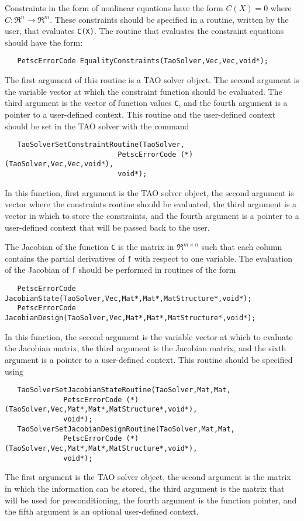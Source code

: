 Constraints in the form of nonlinear equations have the form
$C(X) = 0$ where $C: \Re^n \to \Re^m$.
These constraints should be specified in a 
routine, written by the user, that evaluates {\tt C(X)}.
The routine that evaluates the constraint equations should have the form:
\begin{verbatim}
   PetscErrorCode EqualityConstraints(TaoSolver,Vec,Vec,void*);
\end{verbatim}
\noindent
The first argument of this routine is a TAO solver object.  The second argument
is the variable vector at which the constraint function should be evaluated.  
The third argument is the vector of function values {\tt C}, and the fourth
argument is a pointer to a user-defined context.
This routine  and the user-defined context 
should be set in the TAO solver with the command
\begin{verbatim}
   TaoSolverSetConstraintRoutine(TaoSolver,
                           PetscErrorCode (*)(TaoSolver,Vec,Vec,void*),
                           void*);
\end{verbatim}
\noindent
In this function, first argument is the TAO solver object,
the second argument is vector where the constraints routine should be
evaluated, the third argument is a vector in which to store the constraints,
and the fourth argument is a pointer to a user-defined context that will
be passed back to the user.

The Jacobian of the function {\tt C} is the matrix in $\Re^{m \times n}$
such that each column contains the partial derivatives of {\tt f} with respect
to one variable. 
The evaluation of the Jacobian of {\tt f} should be performed in routines
of the form
\begin{verbatim}
   PetscErrorCode JacobianState(TaoSolver,Vec,Mat*,Mat*,MatStructure*,void*);
   PetscErrorCode JacobianDesign(TaoSolver,Vec,Mat*,Mat*,MatStructure*,void*);
\end{verbatim}
\noindent
In this function, the second argument is the variable vector at which to 
evaluate the Jacobian matrix, the third argument is the Jacobian matrix,
and the sixth argument is a pointer to a user-defined context.
This routine should be specified using
\begin{verbatim}
   TaoSolverSetJacobianStateRoutine(TaoSolver,Mat,Mat,
              PetscErrorCode (*)(TaoSolver,Vec,Mat*,Mat*,MatStructure*,void*), 
              void*);
   TaoSolverSetJacobianDesignRoutine(TaoSolver,Mat,Mat,
              PetscErrorCode (*)(TaoSolver,Vec,Mat*,Mat*,MatStructure*,void*), 
              void*);
\end{verbatim}
\noindent
The first argument is the TAO solver object, the second
argument is the matrix in which the information can be stored,
the third argument is the matrix that will be used for preconditioning,
the fourth argument is the function pointer, and the fifth argument is
an optional user-defined context.

